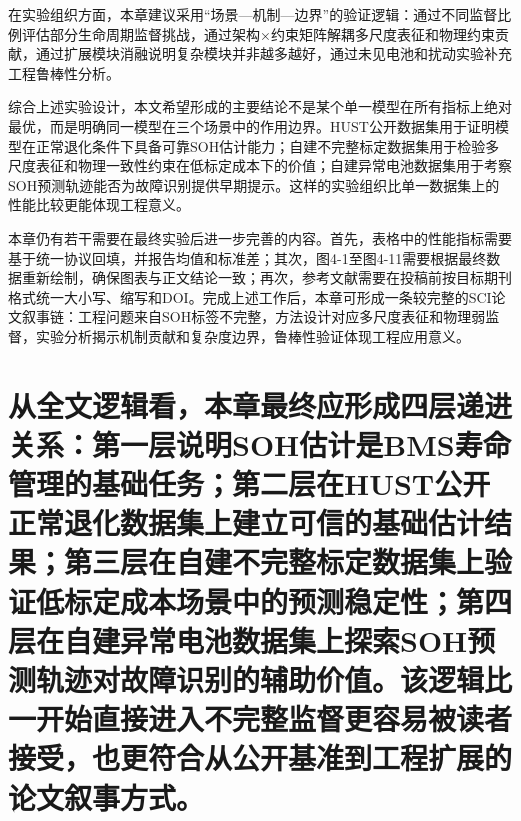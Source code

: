 \documentclass[12pt, a4paper]{ctexart}
\begin{document}
在实验组织方面，本章建议采用“场景—机制—边界”的验证逻辑：通过不同监督比例评估部分生命周期监督挑战，通过架构×约束矩阵解耦多尺度表征和物理约束贡献，通过扩展模块消融说明复杂模块并非越多越好，通过未见电池和扰动实验补充工程鲁棒性分析。


综合上述实验设计，本文希望形成的主要结论不是某个单一模型在所有指标上绝对最优，而是明确同一模型在三个场景中的作用边界。HUST公开数据集用于证明模型在正常退化条件下具备可靠SOH估计能力；自建不完整标定数据集用于检验多尺度表征和物理一致性约束在低标定成本下的价值；自建异常电池数据集用于考察SOH预测轨迹能否为故障识别提供早期提示。这样的实验组织比单一数据集上的性能比较更能体现工程意义。


本章仍有若干需要在最终实验后进一步完善的内容。首先，表格中的性能指标需要基于统一协议回填，并报告均值和标准差；其次，图4-1至图4-11需要根据最终数据重新绘制，确保图表与正文结论一致；再次，参考文献需要在投稿前按目标期刊格式统一大小写、缩写和DOI。完成上述工作后，本章可形成一条较完整的SCI论文叙事链：工程问题来自SOH标签不完整，方法设计对应多尺度表征和物理弱监督，实验分析揭示机制贡献和复杂度边界，鲁棒性验证体现工程应用意义。




\section{从全文逻辑看，本章最终应形成四层递进关系：第一层说明SOH估计是BMS寿命管理的基础任务；第二层在HUST公开正常退化数据集上建立可信的基础估计结果；第三层在自建不完整标定数据集上验证低标定成本场景中的预测稳定性；第四层在自建异常电池数据集上探索SOH预测轨迹对故障识别的辅助价值。该逻辑比一开始直接进入不完整监督更容易被读者接受，也更符合从公开基准到工程扩展的论文叙事方式。}
\end{document}
